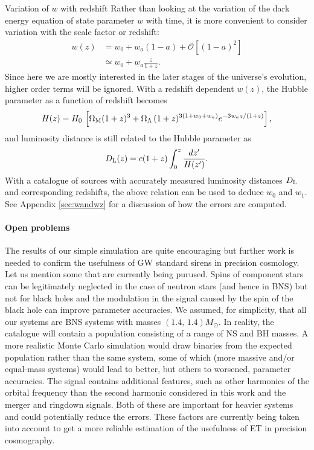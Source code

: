 {Variation of $w$ with redshift}
{
Rather than looking at the variation of the dark energy equation of state parameter 
$w$ with time, it is more convenient to consider variation with the scale factor or redshift:
\begin{align}
w(z) &= w_0 + w_a (1-a) + \mathcal{O}\left[(1-a)^2\right] \nonumber\\
     &\simeq w_0 + w_a \frac{z}{1+z}.
\end{align}
Since here we are mostly interested in the later stages of the 
universe's evolution, higher order terms will be ignored. With a 
redshift dependent $w(z)$, the Hubble parameter as a function of redshift 
becomes
\begin{equation}
H(z) = H_0\,\left[\Omega_{\rm M}(1+z)^3 + \Omega_\Lambda\,(1+z)^{3(1+w_0+w_a)}e^{-3 w_a z/(1+z)}\right],
\end{equation}
and luminosity distance is still related to the Hubble parameter as
\begin{equation}
D_{\rm L}(z) = c(1+z)\int_0^z \frac{dz'}{H(z')}.
\end{equation}
With a catalogue of sources with accurately measured luminosity distances 
$D_{\rm L}$ and corresponding redshifts, the above relation can be used to
deduce $w_0$ and $w_1.$ See Appendix  \ref{sec:wandwz} for a discussion of how
the errors are computed.
}

\paragraph{Open problems}

The results of our simple simulation are quite encouraging but further
work is needed to confirm the usefulness of GW standard sirens in
precision cosmology. Let us mention some that are currently being purused.
Spins of component stars can be legitimately neglected in the case of
neutron stars (and hence in BNS) but not for black holes and the
modulation in the signal caused by the spin of the black hole
can improve parameter accuracies. We assumed, for simplicity, that
all our systems are BNS systems with masses $(1.4,\,1.4)M_\odot.$
In reality, the catalogue will contain a population consisting of a
range of NS and BH masses. A more realistic Monte Carlo simulation
would draw binaries from the expected population rather than the same system,
some of which (more massive and/or equal-mass systems) would lead to
better, but others to worsened, parameter accuracies.
The signal contains additional features, such as other harmonics
of the orbital frequency than the second harmonic considered in this
work and the merger and ringdown signals. Both of these are important
for heavier systems and could potentially reduce the errors.
These factors are currently being taken into account to
get a more reliable estimation of the usefulness of ET in precision
cosmography.


